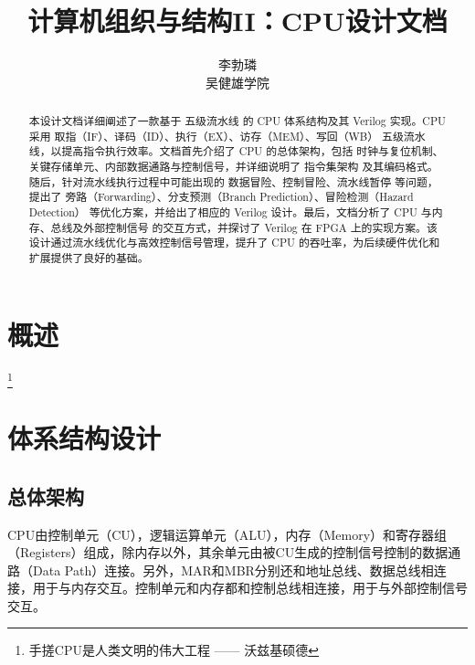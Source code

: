 \documentclass[lang=cn,a4paper,newtx]{elegantpaper}
\title{计算机组织与结构II：CPU设计文档}
\author{李勃璘 \\ 吴健雄学院}
\date{\zhdate{2025/4/11}}
\begin{document}
\maketitle
\thispagestyle{empty}
\begin{abstract}
本设计文档详细阐述了一款基于 五级流水线 的 CPU 体系结构及其 Verilog 实现。CPU 采用 取指（IF）、译码（ID）、执行（EX）、访存（MEM）、写回（WB） 五级流水线，以提高指令执行效率。文档首先介绍了 CPU 的总体架构，包括 时钟与复位机制、关键存储单元、内部数据通路与控制信号，并详细说明了 指令集架构 及其编码格式。随后，针对流水线执行过程中可能出现的 数据冒险、控制冒险、流水线暂停 等问题，提出了 旁路（Forwarding）、分支预测（Branch Prediction）、冒险检测（Hazard Detection） 等优化方案，并给出了相应的 Verilog 设计。最后，文档分析了 CPU 与内存、总线及外部控制信号 的交互方式，并探讨了 Verilog 在 FPGA 上的实现方案。该设计通过流水线优化与高效控制信号管理，提升了 CPU 的吞吐率，为后续硬件优化和扩展提供了良好的基础。
\end{abstract}








\newpage
{}
\tableofcontents
\newpage
\listoftables
\newpage
{}
\section{概述}
\lipsum[1]\footnote{手搓CPU是人类文明的伟大工程 —— 沃兹基硕德}


\section{体系结构设计}
\subsection{总体架构}
CPU由控制单元（CU），逻辑运算单元（ALU），内存（Memory）和寄存器组（Registers）组成，除内存以外，其余单元由被CU生成的控制信号控制的数据通路（Data Path）连接。另外，MAR和MBR分别还和地址总线、数据总线相连接，用于与内存交互。控制单元和内存都和控制总线相连接，用于与外部控制信号交互。
\end{document}
